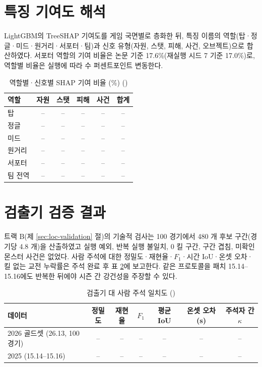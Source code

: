 \section{특징 기여도 해석}
\label{sec:results-shap}

LightGBM의 TreeSHAP 기여도를 게임 국면별로 층화한 뒤, 특징 이름의 역할(탑·정글·미드·원거리·서포터·팀)과 신호 유형(자원, 스탯, 피해, 사건, 오브젝트)으로 합산하였다. 서포터 역할의 기여 비율은 논문 기준 17.6\%(재실행 시드 7 기준 17.0\%)로, 역할별 비율은 실행에 따라 수 퍼센트포인트 변동한다. 

\begin{table}[htbp]
  \centering
  \caption{역할별·신호별 SHAP 기여 비율 (\%) ()}
  \label{tab:shap}
  \small
  \begin{tabular}{@{}lccccc@{}}
    \toprule
    역할 & 자원 & 스탯 & 피해 & 사건 & 합계 \\
    \midrule
    탑 & -- & -- & -- & -- & -- \\
    정글 & -- & -- & -- & -- & -- \\
    미드 & -- & -- & -- & -- & -- \\
    원거리 & -- & -- & -- & -- & -- \\
    서포터 & -- & -- & -- & -- & -- \\
    팀 전역 & -- & -- & -- & -- & -- \\
    \bottomrule
  \end{tabular}
\end{table}

\section{검출기 검증 결과}
\label{sec:results-detector}

트랙 B(제 \ref{sec:loc-validation} 절)의 기술적 검사는 100 경기에서 480 개 후보 구간(경기당 4.8 개)을 산출하였고 실행 예외, 반복 실행 불일치, 0 킬 구간, 구간 겹침, 미확인 몬스터 사건은 없었다. 사람 주석에 대한 정밀도·재현율·$F_1$·시간 IoU·온셋 오차·킬 없는 교전 누락률은 주석 완료 후 표 \ref{tab:detector}에 보고한다. 같은 프로토콜을 패치 15.14--15.16에도 반복한 뒤에야 시즌 간 강건성을 주장할 수 있다.

\begin{table}[htbp]
  \centering
  \caption{검출기 대 사람 주석 일치도 ()}
  \label{tab:detector}
  \small
  \begin{tabular}{@{}lcccccc@{}}
    \toprule
    데이터 & 정밀도 & 재현율 & $F_1$ & 평균 IoU & 온셋 오차 (s) & 주석자 간 $\kappa$ \\
    \midrule
    2026 골드셋 (26.13, 100 경기) & -- & -- & -- & -- & -- & -- \\
    2025 (15.14--15.16) & -- & -- & -- & -- & -- & -- \\
    \bottomrule
  \end{tabular}
\end{table}
